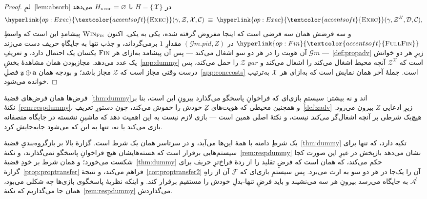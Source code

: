 \documentclass[10pt,oneside,openany]{book}
\newcommand{\PID}{\mathit{pid}}
\renewcommand{\emptyset}{\varnothing}
\newcommand{\pars}{\mathit{par}}
\newcommand{\Corr}{\mathcal{C}}
\newcommand{\F}{\mathcal{F}}
\newcommand{\Zenv}{\mathcal{Z}}
\newcommand{\Adv}{\mathcal{A}}
\newcommand{\Dum}{\mathcal{D}}
\newcommand{\bd}[1]{\mathbf{#1}}
\newcommand{\op}[1]{\textnormal{\textsc{#1}}}
\newcommand{\opl}[1]{\hyperlink{op:#1}{\textcolor{accentsoft}{\op{#1}}}}
\newcommand{\fopl}[1]{\hyperlink{op:#1}{\textcolor{accentsoft}{\op{Full}\op{#1}}}}
\newcommand{\Gm}{\mathcal{G}m}
\newcommand{\Win}{\op{Win}}
\theoremstyle{accentdef}
\theoremstyle{accentplain}
\begin{document}
\begin{proof}
لمِ~\ref{lem:absorb} در $H = \{\mathcal{X}\}$ با $H_{\op{keep}} =
\emptyset$ می‌دهد
\[
  \opl{Exec}(\gamma,\Zenv,\mathcal{X},\Corr)
  \;\equiv\;
  \opl{Exec}(\gamma,\Zenv^{\mathcal{X}},\Dum,\Corr) ,
\]
و سه فرضش همان سه فرضی است که اینجا مفروض گرفته شده، یکی به یکی. اکنون
$\Win_{\op{Fin}}$ پیشامدِ این است که واسطِ $\fopl{Fin}$ در $(\Gm.\PID,Z)$
مقدارِ $1$ برمی‌گرداند، و جذب تنها به جایگاهِ حریف دست می‌زند --- $\Gm$ آن
هویت را در هر دو سو اشغال می‌کند --- پس آن پیشامد به‌ازای هر $\op{Fin}$
یکسان یک احتمال دارد، و تعریفِ~\ref{def:propadv} زیرِ هر دو خوانش یک عدد
می‌دهد. مجازبودن همان مشاهدهٔ بخشِ~\ref{app:dummy} است که
$\Zenv^{\mathcal{X}}$ آنچه محیط اشغال می‌کند را اشغال می‌کند و $\pars$ِ
$\Zenv$ را حمل می‌کند، پس درست وقتی مجاز است که $\Zenv$ مجاز باشد؛ و
بودجه همان $\bd{z} \oplus \bd{a}$ِ فصلِ~\ref{app:conccosts} است. جملهٔ
آخر همان نمایش است که به‌ازای هر $\mathcal{X}$ به‌ترتیب خوانده می‌شود.
\end{proof}

فرض‌ها همان فرض‌های قضیهٔ~\ref{thm:dummy}اند و نه بیشتر: سیستمِ بازی‌ای که
فراخوانِ پاسخگو می‌گذارد بیرونِ این است، بنا بر
نکتهٔ~\ref{rem:respdummy}، و همچنین محیطی که هویت‌های $Z$ِ خودش را خموش
می‌کند، چون دستورِ تعریفِ~\ref{def:zadv} زیرِ ادعایی $Z$ بیرون می‌رود.
هیچ‌یک شرطی بر آنچه اشغال‌گر \emph{می‌کند} نیست، و نکتهٔ اصلی همین است ---
بازی لازم نیست به این اهمیت دهد که ماشینِ نشسته در جایگاه منصفانه بازی
می‌کند یا نه، تنها به این که می‌شود جابه‌جایش کرد.

یک شرطِ دامنه با همهٔ این‌ها می‌آید، و در سرتاسر همان یک شرط است. گزارهٔ
بالا بر بازگروه‌بندیِ قضیهٔ~\ref{thm:dummy} تکیه دارد، که تنها برای
سیستم‌هایی برقرار است که هسته‌هایشان هیچ فراخوانِ پاسخگو نمی‌گذارند، و
نکتهٔ~\ref{rem:respdummy} نشان می‌دهد بازپخش در غیرِ این صورت کجا شکست
می‌خورد؛ و همان شرط بر خودِ قضیهٔ~\ref{thm:dummy} حکم می‌کند، که همان است
که فرضِ تقلید را از ردهٔ فراخ‌ترِ حریف برای
گزارهٔ~\ref{prop:proptransfer} فراهم می‌کند، و
نتیجهٔ~\ref{cor:proptransfer2} آن را یک‌جا در هر دو سو به ارث می‌برد. پس
سیستمِ بازی‌ای که $\F$ِ آن از راهِ $\Adv^{!}$ به جایگاه می‌رسد بیرونِ هر سه
می‌نشیند و باید فرضِ تنها-بدلِ خودش را مستقیم برقرار کند. و اینکه نظریهٔ
پاسخگوی بازی‌ها چه شکلی می‌بود، همان جا می‌گذاریم که
نکتهٔ~\ref{rem:respdummy} می‌گذاردش.
\end{document}
